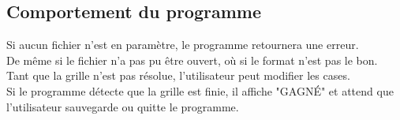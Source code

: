 \documentclass{article}
\begin{document}
\subsection{Comportement du programme}
Si aucun fichier n'est en paramètre, le programme retournera une erreur. \\
De même si le fichier n'a pas pu être ouvert, où si le format n'est pas le bon. \\
Tant que la grille n'est pas résolue, l'utilisateur peut modifier les cases. \\
Si le programme détecte que la grille est finie, il affiche "GAGNÉ" et attend que l'utilisateur sauvegarde ou quitte le programme.
\end{document}
